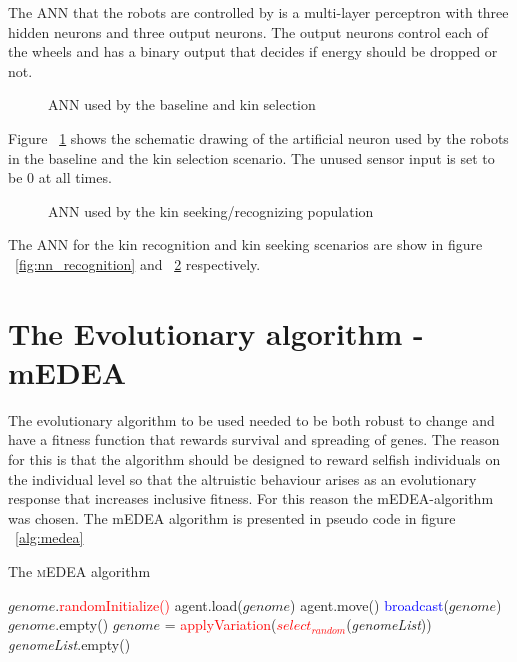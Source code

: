 \documentclass[a4paper]{book}
\begin{document}
The ANN that the robots are controlled by is a multi-layer perceptron with three hidden neurons and three output neurons.
The output neurons control each of the wheels and has a binary output that decides if energy should be dropped or not. 

\begin{figure}
\centering
\def\svgwidth{\columnwidth}

\label{fig:nn_default}
\caption{ANN used by the baseline and kin selection}
\end{figure}

Figure ~\ref{fig:nn_default} shows the schematic drawing of the artificial neuron used by the robots in the baseline and the kin selection scenario. 
The unused sensor input is set to be 0 at all times. 


\begin{figure}
\centering
\def\svgwidth{\columnwidth}

\label{fig:nn_seeking}
\caption{ANN used by the kin seeking/recognizing population}
\end{figure}

	

%


The ANN for the kin recognition and kin seeking scenarios are show in figure ~\ref{fig:nn_recognition} and ~\ref{fig:nn_seeking} respectively. 

\section{The Evolutionary algorithm - mEDEA}

The evolutionary algorithm to be used needed to be both robust to change and have a fitness function that rewards survival and spreading of genes. 
The reason for this is that the algorithm should be designed to reward selfish individuals on the individual level so that the altruistic behaviour arises as an evolutionary 
response that increases inclusive fitness. 
For this reason the mEDEA-algorithm was chosen.
The mEDEA algorithm is presented in pseudo code in figure ~\ref{alg:medea}
\begin{algorithm}[H]
\caption{The \textsc{mEDEA} algorithm}
{
\begin{algorithmic}[1]
 \STATE $genome$.\textcolor{red}{randomInitialize()}
     \STATE agent.load($genome$)
   \ENDIF
       \STATE agent.move()
       \STATE \textcolor{blue}{broadcast}($genome$)
     \ENDIF
   \ENDFOR
   \STATE $genome$.empty()
     \STATE $genome$ = \textcolor{red}{applyVariation}(\textcolor{red}{$select_{random}$}(\textit{genomeList}))
     \ENDIF
     \STATE \textit{genomeList}.empty()
 \ENDWHILE
 \end{algorithmic}
}
\label{alg:medea}
 \end{algorithm}
\end{document}
